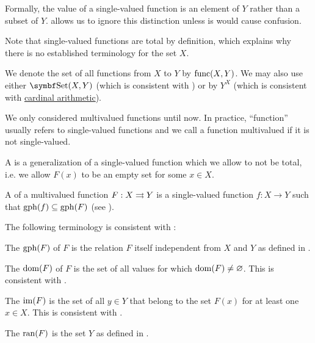 \begin{definition}
\begin{DefEnum}[series=def:function]
    Formally, the value of a single-valued function is an element of \( Y \) rather than a subset of \( Y \).  allows us to ignore this distinction unless is would cause confusion.

    Note that single-valued functions are total by definition, which explains why there is no established terminology for the set \( X \).

    We denote the set of all functions from \( X \) to \( Y \) by \( \operatorname{func}(X, Y) \). We may also use either \( \Cat{Set}(X, Y) \) (which is consistent with ) or by \( Y^X \) (which is consistent with \hyperref[def:cardinal_arithmetic]{cardinal arithmetic}).

     We only considered multivalued functions until now. In practice, \enquote{function} usually refers to single-valued functions and we call a function multivalued if it is not single-valued.

     A  is a generalization of a single-valued function which we allow to not be total, i.e. we allow \( F(x) \) to be an empty set for some \( x \in X \).

     A  of a multivalued function \( F: X \rightrightarrows Y \) is a single-valued function \( f: X \to Y \) such that \( \operatorname{gph}(f) \subseteq \operatorname{gph}(F) \) (see ).
  \end{DefEnum}

  The following terminology is consistent with :
  \begin{DefEnum}[resume=def:function]
     The  \( \operatorname{gph}(F) \) of \( F \) is the relation \( F \) itself independent from \( X \) and \( Y \) as defined in .

     The  \( \operatorname{dom}(F) \) of \( F \) is the set of all values for which \( \operatorname{dom}(F) \neq \varnothing \). This is consistent with .

     The  \( \operatorname{im}(F) \) is the set of all \( y \in Y \) that belong to the set \( F(x) \) for at least one \( x \in X \). This is consistent with .

     The  \( \operatorname{ran}(F) \) is the set \( Y \) as defined in .


\end{DefEnum}
\end{definition}
